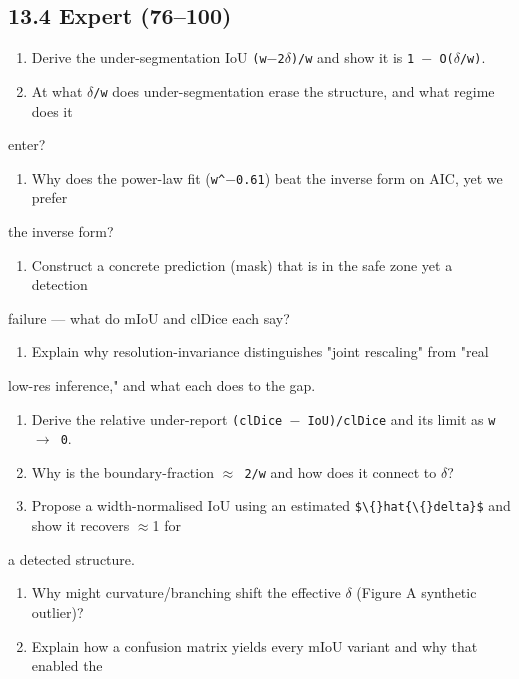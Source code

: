 \documentclass[11pt]{article}
\begin{document}
\subsection*{13.4 Expert (76--100)}

\begin{enumerate}\setlength{\itemsep}{1pt}
\item Derive the under-segmentation IoU \texttt{(w$-$2$\delta$)/w} and show it is \texttt{1 $-$ O($\delta$/w)}.
\item At what \texttt{$\delta$/w} does under-segmentation erase the structure, and what regime does it
\end{enumerate}
    enter?
\begin{enumerate}\setlength{\itemsep}{1pt}
\item Why does the power-law fit (\texttt{w\textasciicircum{}$-$0.61}) beat the inverse form on AIC, yet we prefer
\end{enumerate}
    the inverse form?
\begin{enumerate}\setlength{\itemsep}{1pt}
\item Construct a concrete prediction (mask) that is in the safe zone yet a detection
\end{enumerate}
    failure --- what do mIoU and clDice each say?
\begin{enumerate}\setlength{\itemsep}{1pt}
\item Explain why resolution-invariance distinguishes "joint rescaling" from "real
\end{enumerate}
    low-res inference," and what each does to the gap.
\begin{enumerate}\setlength{\itemsep}{1pt}
\item Derive the relative under-report \texttt{(clDice $-$ IoU)/clDice} and its limit as \texttt{w $\rightarrow$ 0}.
\item Why is the boundary-fraction \texttt{$\approx$ 2/w} and how does it connect to \texttt{$\delta$}?
\item Propose a width-normalised IoU using an estimated \texttt{\$\textbackslash\{\}hat\{\textbackslash\{\}delta\}\$} and show it recovers $\approx$1 for
\end{enumerate}
    a detected structure.
\begin{enumerate}\setlength{\itemsep}{1pt}
\item Why might curvature/branching shift the effective \texttt{$\delta$} (Figure A synthetic outlier)?
\item Explain how a confusion matrix yields every mIoU variant and why that enabled the
\end{enumerate}
\end{document}
